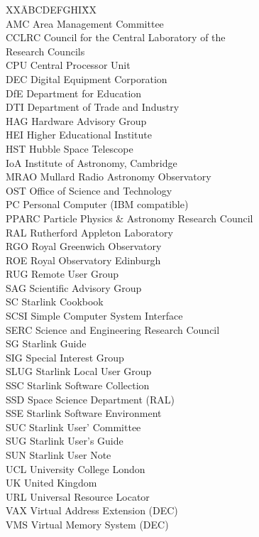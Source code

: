 {\small
\begin{tabbing}
XX\=ABCDEFGHI\=XX\kill
\>  \>  \\
\>AMC   \>Area Management Committee  \\
\>CCLRC \>Council for the Central Laboratory of the\\
\>      \>Research Councils\\
\>CPU   \>Central Processor Unit \\
\>DEC   \>Digital Equipment Corporation\\
\>DfE   \>Department for Education \\
\>DTI   \>Department of Trade and Industry \\
\>HAG   \>Hardware Advisory Group\\
\>HEI   \>Higher Educational Institute  \\
\>HST   \>Hubble Space Telescope\\
\>IoA   \>Institute of Astronomy, Cambridge\\
\>MRAO  \>Mullard Radio Astronomy Observatory  \\
\>OST   \>Office of Science and Technology \\
\>PC    \>Personal Computer (IBM compatible)\\
\>PPARC \>Particle Physics \& Astronomy Research Council\\
\>RAL   \>Rutherford Appleton Laboratory\\
\>RGO   \>Royal Greenwich Observatory\\
\>ROE   \>Royal Observatory Edinburgh\\
\>RUG   \> Remote User Group \\
\>SAG   \>Scientific Advisory Group\\
\>SC    \>Starlink Cookbook\\
\>SCSI  \>Simple Computer System Interface\\
\>SERC  \>Science and Engineering Research Council\\
\>SG    \>Starlink Guide\\
\>SIG   \>Special Interest Group\\
\>SLUG  \>Starlink Local User Group\\
\>SSC   \>Starlink Software Collection\\
\>SSD   \>Space Science Department (RAL)\\
\>SSE   \>Starlink Software Environment \\
\>SUC   \>Starlink User' Committee \\
\>SUG   \>Starlink User's Guide\\
\>SUN   \>Starlink User Note\\
\>UCL   \>University College London\\
\>UK    \>United Kingdom \\
\>URL   \>Universal Resource Locator\\
\>VAX   \>Virtual Address Extension (DEC)\\
\>VMS   \>Virtual Memory System (DEC)\\
\end{tabbing}
}

